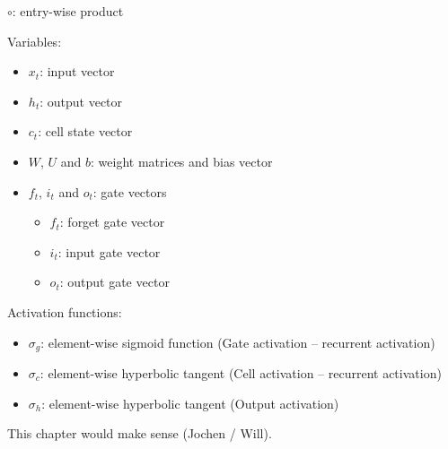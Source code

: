 $\circ$: entry-wise product


Variables:
\begin{itemize}
\item $x_t$: input vector
\item $h_t$: output vector
\item $c_t$: cell state vector
\item $W$, $U$ and $b$: weight matrices and bias vector
\item $f_t$, $i_t$ and $o_t$: gate vectors
  \begin{itemize}
  \item $f_t$: forget gate vector
  \item $i_t$: input gate vector
  \item $o_t$: output gate vector
  \end{itemize}
\end{itemize}

Activation functions:
\begin{itemize}
\item $\sigma_g$: element-wise sigmoid function (Gate activation -- recurrent
  activation)
\item $\sigma_c$: element-wise hyperbolic tangent (Cell activation -- recurrent
  activation)
\item $\sigma_h$: element-wise hyperbolic tangent (Output activation)
\end{itemize}

This chapter would make sense (Jochen / Will).


